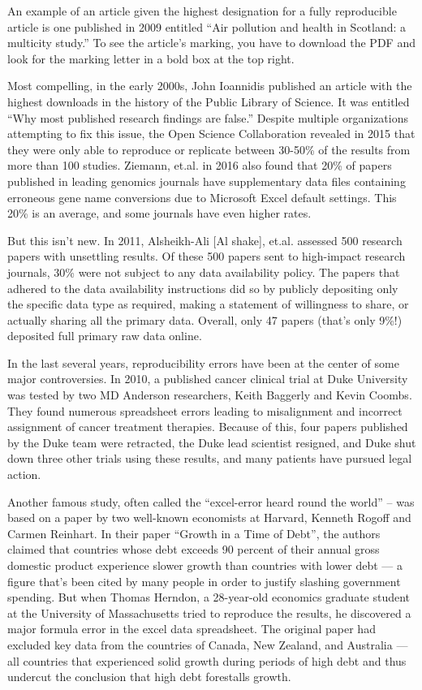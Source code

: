 \documentclass[
]{book}
\begin{document}
An example of an article given the highest designation for a fully reproducible article is one published in 2009 entitled ``Air pollution and health in Scotland: a multicity study.'' To see the article's marking, you have to download the PDF and look for the marking letter in a bold box at the top right.

Most compelling, in the early 2000s, John Ioannidis published an article with the highest downloads in the history of the Public Library of Science. It was entitled ``Why most published research findings are false.'' Despite multiple organizations attempting to fix this issue, the Open Science Collaboration revealed in 2015 that they were only able to reproduce or replicate between 30-50\% of the results from more than 100 studies. Ziemann, et.al. in 2016 also found that 20\% of papers published in leading genomics journals have supplementary data files containing erroneous gene name conversions due to Microsoft Excel default settings. This 20\% is an average, and some journals have even higher rates.

But this isn't new. In 2011, Alsheikh-Ali {[}Al shake{]}, et.al. assessed 500 research papers with unsettling results. Of these 500 papers sent to high-impact research journals, 30\% were not subject to any data availability policy. The papers that adhered to the data availability instructions did so by publicly depositing only the specific data type as required, making a statement of willingness to share, or actually sharing all the primary data. Overall, only 47 papers (that's only 9\%!) deposited full primary raw data online.

In the last several years, reproducibility errors have been at the center of some major controversies. In 2010, a published cancer clinical trial at Duke University was tested by two MD Anderson researchers, Keith Baggerly and Kevin Coombs. They found numerous spreadsheet errors leading to misalignment and incorrect assignment of cancer treatment therapies. Because of this, four papers published by the Duke team were retracted, the Duke lead scientist resigned, and Duke shut down three other trials using these results, and many patients have pursued legal action.

Another famous study, often called the ``excel-error heard round the world'' -- was based on a paper by two well-known economists at Harvard, Kenneth Rogoff and Carmen Reinhart. In their paper ``Growth in a Time of Debt'', the authors claimed that countries whose debt exceeds 90 percent of their annual gross domestic product experience slower growth than countries with lower debt --- a figure that's been cited by many people in order to justify slashing government spending. But when Thomas Herndon, a 28-year-old economics graduate student at the University of Massachusetts tried to reproduce the results, he discovered a major formula error in the excel data spreadsheet. The original paper had excluded key data from the countries of Canada, New Zealand, and Australia --- all countries that experienced solid growth during periods of high debt and thus undercut the conclusion that high debt forestalls growth.
\end{document}
